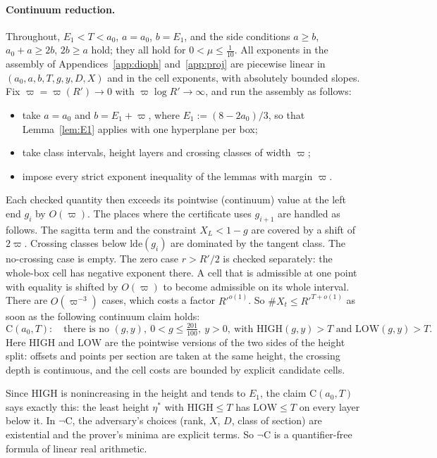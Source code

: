 \paragraph{Continuum reduction.} Throughout, $E_1<T<a_0$, $a=a_0$, $b=E_1$, and the side conditions
$a\ge b$, $a_0+a\ge2b$, $2b\ge a$ hold; they all hold for $0<\mu\le\frac1{10}$. All exponents in the assembly of Appendices~\ref{app:dioph}
and~\ref{app:proj} are piecewise linear in $(a_0,a,b,T,g,y,D,X)$ and in the cell exponents, with
absolutely bounded slopes. Fix $\varpi=\varpi(R')\to0$ with $\varpi\log R'\to\infty$, and run the assembly
as follows:
\begin{itemize}\setlength\itemsep{0pt}
\item take $a=a_0$ and $b=E_1+\varpi$, where $E_1:=(8-2a_0)/3$, so that Lemma~\ref{lem:E1} applies with one
hyperplane per box;
\item take class intervals, height layers and crossing classes of width $\varpi$;
\item impose every strict exponent inequality of the lemmas with margin $\varpi$.
\end{itemize}
Each checked quantity then exceeds its pointwise (continuum) value at the left end $g_i$ by $O(\varpi)$.
The places where the certificate uses $g_{i+1}$ are handled as follows. The sagitta term and the constraint
$X_L<1-g$ are covered by a shift of $2\varpi$. Crossing classes below $\mathrm{lde}(g_i)$ are dominated by the
tangent class. The no-crossing case is empty. The zero case $r>R'/2$ is checked separately: the whole-box
cell has negative exponent there. A cell that is admissible
at one point with equality is shifted by $O(\varpi)$ to become admissible on its whole interval. There are
$O(\varpi^{-3})$ cases, which costs a factor $R'^{o(1)}$. So $\#X_t\le R'^{T+o(1)}$ as soon as the
following continuum claim holds:
\[
\mathrm C(a_0,T):\quad\text{there is no }(g,y),\ 0<g\le\tfrac{201}{100},\ y>0,\ \text{with }
\mathrm{HIGH}(g,y)>T\text{ and }\mathrm{LOW}(g,y)>T .
\]
Here $\mathrm{HIGH}$ and $\mathrm{LOW}$ are the pointwise versions of the two sides of the height split:
offsets and points per section are taken at the same height, the crossing depth is continuous, and the
cell costs are bounded by explicit candidate cells.

Since $\mathrm{HIGH}$ is nonincreasing in the height and tends to $E_1$, the claim $\mathrm C(a_0,T)$ says
exactly this: the least height $\eta^*$ with $\mathrm{HIGH}\le T$ has $\mathrm{LOW}\le T$ on every layer
below it. In $\neg\mathrm C$, the adversary's choices (rank, $X$, $D$, class of section) are existential and the
prover's minima are explicit terms. So $\neg\mathrm C$ is a quantifier-free formula of linear real
arithmetic.

